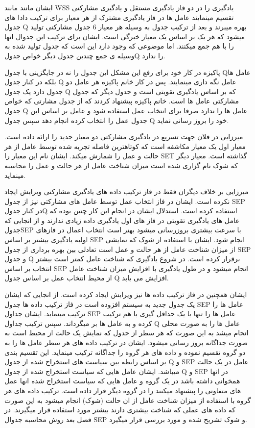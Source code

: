 ایشان مانند مانند WSS یادگیری را در دو فاز یادگیری مستقل و یادگیری مشارکتی تقسیم مینمایند عامل ها در فاز یادگیری مشترک از هر معیار برای ترکیب دادا های جدول Q بهره میبرند و بعد از ترکیب جدول به وسیله هر معیار 6 جدول مشارکتی تولید میشود که هر یک بر اساس یک معیار خبرگی است. ایشان برای ترکیب این جدوال انها را با هم جمع میکنند. اما موضوعی که وجود دارد این است که جدول تولید شده به وسیله ی جمع چندین جدول دیگر خواص جدولQ را ندارد.

 پاکیزه در کار خود برای رفع این مشکل این جدول را نه در جایگزینی با جدول Qعامل ها بلکه در کنار جدول Q عامل نگه داری مینمایند.
پس در کار خانم پاکیزه هر عامل دو جدول دارد یک جدول Q که بر اساس یادگیری تقویتی است و جدول دیگر که جدول مشارکتی عامل ها است. خانم پاکیزه پیشنهاد کردند که از جدول مشارتی که خواص جدول Q عامل ها را ندارد صرفا برای انتخاب عمل استفاده شود و عامل بر اساس این جدول عمل را انتخاب کرده انجام دهد سپس جدول Q خود را بروز رسانی نماید.

میرزایی در فلان جهت تسریع در یادگیری مشارکتی دو معیار جدید را ارائه داده است. معیار اول یک معیار مکاشفه است که کوتاهترین فاصله تجربه شده توسط عامل از هر حالت و عمل را شمارش میکند. ایشان نام این معیار را SET گذاشته است. معیار دیگر که شوک نام گزاری شده است میزان شناخت عامل از هر حالت و عمل را محاسبه مینماید.

میرزایی بر خلاف دیگران فقط در فاز ترکیب داده های یادگیری مشارکتی ویرایش ایجاد نکرده است. ایشان در فاز انتخاب عمل توسط عامل های مشارکتی نیز از جدول SEP در کنار جدولQ استفاده کرده است. استدلال ایشان در انجام این کار چنین بوده که عامل های یادگیری تقویتی در فاز های اول یادگیری داده زیادی ندارند و از انجایی که جدولSEP با سرعت بیشتری بروزرسانی میشود بهتر است انتخاب اعمال در فازهای اولیه یادگیری بیشتر بر اساس SEP انجام شود. ایشان با استفاده از شوک که نمایشی از میزان شناخت عامل از هر حالت و عمل است تعادلی بین بهره برداری از جدول SEP و جدول Q برقرار کرده است. در شروع یادگیری که شناخت عامل کمتر است بیشتر انتخاب بر اساس SEP انجام میشود و در طول یادگیری با افزایش میزان شناخت عامل از محیط انتخاب عمل بر اساس جدول Q افزایش می یابد.

ایشان همچنین در فاز ترکیب داده ها نیز ویرایش ایجاد کرده است. از انجایی که ایشان یک جدول جدید به سیستم افزوده است در فاز ترکیب داده ها جدول SEP عامل ها را ترکیب مینماید. ایشان جداول SEP عامل ها را تنها با یک حداقل گیری با هم ترکیب کرده و به عامل ها بر میگرداند. سپس ترکیب جداول Q عامل ها را به صورت محلی انجام میشد به این صورت که هر سطر از جدول که نمایش یک حالت از محیط است به صورت جداگانه بروز رسانی میشود. ایشان در ترکیب داده های هر سطر عامل ها را به دو گروه تقسیم نموده و داده های هر گروه را جداگانه ترکیب مینماید. این تقسیم بندی بر اساس رابطه بین سیاست های استخراج شده از جدول Q و SEP عامل در یک حالت میباشد. ایشان عامل هایی که سیاست استخراج شده از جدول Q و SEP در انها همخوانی داشته باشد در یک گروه و عامل هایی که سیاست استخراج شده انها عمل های متفاوتی را پیشنهاد میکنند را در گروه دیگر قرار داده است. ترکیب داده های هر گروه با استفاده از میزان شناخت عامل از ان حالت (شوک) انجام میشود به این صورت که داده های عملی که شناخت بیشتری دارند بیشتر مورد استفاده قرار میگیرند. در فصل بعد روش محاسبه جدوال SEP و شوک تشریح شده و مورد بررسی قرار میگیرد.